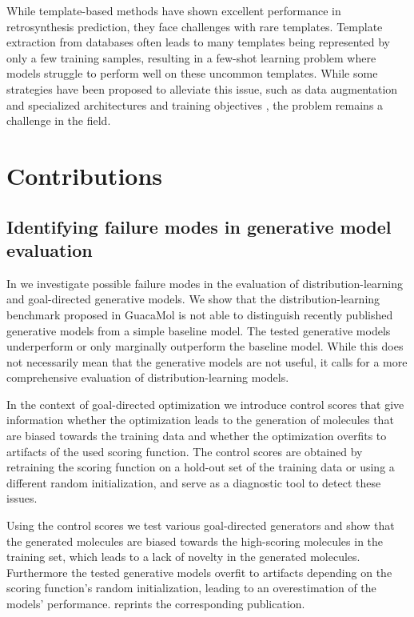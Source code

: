 While template-based methods have shown excellent performance in retrosynthesis prediction, they
face challenges with rare templates. Template extraction from databases often leads to many
templates being represented by only a few training
samples\citep{fortunatoDataAugmentationPretraining2020}, resulting in a few-shot learning problem
where models struggle to perform well on these uncommon templates. While some strategies have been
proposed to alleviate this issue, such as data augmentation
\citep{fortunatoDataAugmentationPretraining2020} and specialized architectures and training
objectives \citep{daiRetrosynthesisPredictionConditional2020}, the problem remains a challenge in
the field.

\section{Contributions\label{sec:contributions}}
\subsection{Identifying failure modes in generative model evaluation}
In \citep{renzFailureModesMolecule2019} we investigate possible failure modes in the evaluation of
distribution-learning and goal-directed generative models. We show that the distribution-learning
benchmark proposed in GuacaMol \citep{brownGuacaMolBenchmarkingModels2019} is not able to
distinguish recently published generative models from a simple baseline model. The tested generative
models underperform or only marginally outperform the baseline model. While this does not
necessarily mean that the generative models are not useful, it calls for a more comprehensive
evaluation of distribution-learning models.

In the context of goal-directed optimization we introduce control scores that give
information whether the optimization leads to the generation of molecules that are biased towards the
training data and whether the optimization overfits to artifacts of the used scoring function.
The control scores are obtained by retraining the scoring function on a hold-out set of the training
data or using a different random initialization, and serve as a diagnostic tool to
detect these issues.

Using the control scores we test various goal-directed generators and show that the generated
molecules are biased towards the high-scoring molecules in the training set, which leads to a lack
of novelty in the generated molecules. Furthermore the tested generative models overfit to artifacts
depending on the scoring function's random initialization, leading to an overestimation of the
models' performance.   reprints the corresponding publication.


